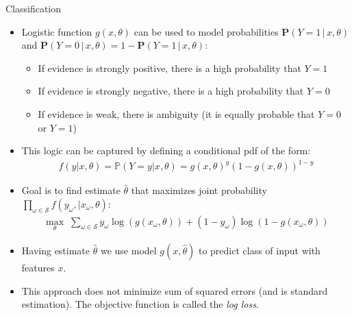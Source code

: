 \documentclass[9pt]{beamer}
\begin{document}
\begin{frame}{Classification}


\begin{itemize}

\item Logistic function $g(x,\theta)$ can be used to model probabilities $\mathbf{P}(Y=1\,|\,x,\theta)$ and $\mathbf{P}(Y=0\,|\,x,\theta)=1-\mathbf{P}(Y=1\,|\,x,\theta)$:

\begin{itemize}
\item If evidence is strongly positive, there is a high probability that $Y=1$
\item If evidence is strongly negative, there is a high probability that  $Y=0$
\item If evidence is weak, there is ambiguity (it is equally probable that $Y=0$ or $Y=1$)
\end{itemize}

\item This logic can be captured by defining a conditional pdf of the form:
\begin{align*}
f(y|x,\theta)=\mathbb{P}(Y=y|x,\theta)=g(x,\theta)^y(1-g(x,\theta))^{1-y}
\end{align*}
\item Goal is to find estimate $\hat{\theta}$ that maximizes joint probability $\prod_{\omega \in \mathcal{S}}f(y_\omega,|x_\omega,\theta)$:
\begin{align*}
\max_{\theta}\; \sum_{\omega \in \mathcal{S}}y_\omega\log(g(x_\omega,\theta))+(1-y_\omega)\log(1-g(x_\omega,\theta))
\end{align*}

\item Having estimate $\hat{\theta}$ we use model $g(x,\hat{\theta})$ to predict class of input with features $x$. 

\item This approach does not minimize sum of squared errors (and is standard estimation).  The objective function is called the {\em log loss}. 
\end{itemize}

\end{frame}
\end{document}
